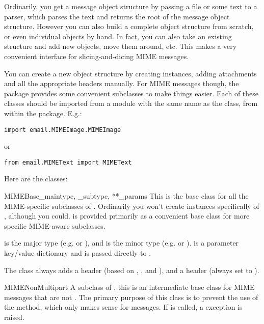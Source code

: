 Ordinarily, you get a message object structure by passing a file or
some text to a parser, which parses the text and returns the root of
the message object structure.  However you can also build a complete
object structure from scratch, or even individual 
objects by hand.  In fact, you can also take an existing structure and
add new  objects, move them around, etc.  This makes a
very convenient interface for slicing-and-dicing MIME messages.

You can create a new object structure by creating 
instances, adding attachments and all the appropriate headers manually.
For MIME messages though, the  package provides some
convenient subclasses to make things easier.  Each of these classes
should be imported from a module with the same name as the class, from
within the  package.  E.g.:

\begin{verbatim}
import email.MIMEImage.MIMEImage
\end{verbatim}

or

\begin{verbatim}
from email.MIMEText import MIMEText
\end{verbatim}

Here are the classes:

\begin{classdesc}{MIMEBase}{_maintype, _subtype, **_params}
This is the base class for all the MIME-specific subclasses of
.  Ordinarily you won't create instances specifically
of , although you could.   is provided
primarily as a convenient base class for more specific MIME-aware
subclasses.

 is the  major type
(e.g.  or ), and  is the
 minor type 
(e.g.  or ).   is a parameter
key/value dictionary and is passed directly to
.

The  class always adds a  header
(based on , , and ), and a
 header (always set to ).
\end{classdesc}

\begin{classdesc}{MIMENonMultipart}{}
A subclass of , this is an intermediate base class for
MIME messages that are not .  The primary purpose
of this class is to prevent the use of the  method,
which only makes sense for  messages.  If
 is called, a 
exception is raised.

\end{classdesc}


